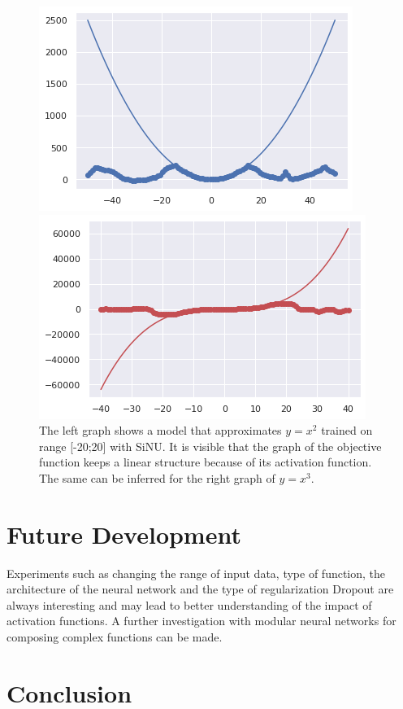 \documentclass{article}
\begin{document}
\begin{figure}[h!]
\begin{multicols}{2}
    \includegraphics[width=\linewidth]{x2_SiNU.png}\par
    \includegraphics[width=\linewidth]{x3_SiNU.png}\par
\end{multicols}
\caption{The left graph shows a model that approximates $y = x^2$ trained on range [-20;20] with SiNU. It is visible that the graph of the objective function keeps a linear structure because of its activation function. The same can be inferred for the right graph of $y=x^3$.}
\end{figure}
\newpage


\section{Future Development}
\label{Future Work}
Experiments such as changing the range of input data, type of function, the architecture of the neural network and the type of regularization Dropout\cite{dropout} are always interesting and may lead to better understanding of the impact of activation functions.
A further investigation with modular neural networks \cite{gnn} for composing complex functions can be made.


\section{Conclusion}
\label{Conclusion}

\printbibliography
\end{document}

